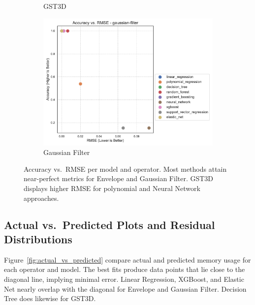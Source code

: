 \begin{figure}[htbp]
\begin{subfigure}[t]{0.32\textwidth}
        \caption{\ac{GST3D}}
    \end{subfigure}
    \hfill
    \begin{subfigure}[t]{0.32\textwidth}
        \includegraphics[width=\textwidth]{assets/images/05/accuracy_by_rmse_per_model_gaussian-filter}
        \caption{Gaussian Filter}
    \end{subfigure}
    \caption{Accuracy vs.\ \ac{RMSE} per model and operator.
        Most methods attain near-perfect metrics for Envelope and Gaussian Filter.
        \ac{GST3D} displays higher \ac{RMSE} for polynomial and Neural Network approaches.
    }
    \label{fig:accuracy_rmse_envelope}
\end{figure}

\subsection{Actual vs.\ Predicted Plots and Residual Distributions}
\label{subsec:actual-vs-predicted-and-residual-distributions}

Figure~\ref{fig:actual_vs_predicted} compare actual and predicted memory usage for each operator and model.
The best fits produce data points that lie close to the diagonal line, implying minimal error.
Linear Regression, XGBoost, and Elastic Net nearly overlap with the diagonal for Envelope and Gaussian Filter.
Decision Tree does likewise for \ac{GST3D}.

